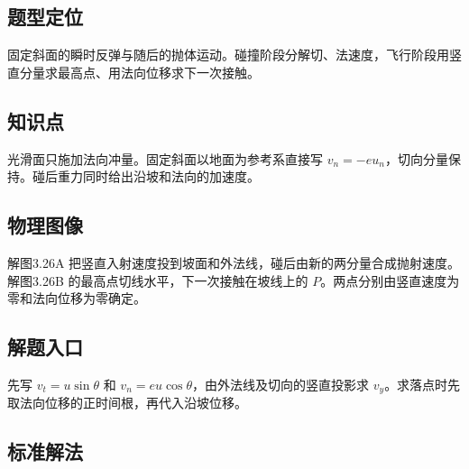 \documentclass[UTF8,fontset=fandol,a4paper,11pt]{ctexart}
\begin{document}


\subsection*{题型定位}

固定斜面的瞬时反弹与随后的抛体运动。碰撞阶段分解切、法速度，飞行阶段用竖直分量求最高点、用法向位移求下一次接触。



\subsection*{知识点}

光滑面只施加法向冲量。固定斜面以地面为参考系直接写 $v_n=-eu_n$，切向分量保持。碰后重力同时给出沿坡和法向的加速度。




\subsection*{物理图像}

解图3.26A 把竖直入射速度投到坡面和外法线，碰后由新的两分量合成抛射速度。解图3.26B 的最高点切线水平，下一次接触在坡线上的 $P$。两点分别由竖直速度为零和法向位移为零确定。



\subsection*{解题入口}

先写 $v_t=u\sin\theta$ 和 $v_n=eu\cos\theta$，由外法线及切向的竖直投影求 $v_y$。求落点时先取法向位移的正时间根，再代入沿坡位移。



\subsection*{标准解法}
\end{document}
